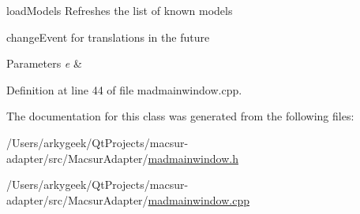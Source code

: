 load\-Models Refreshes the list of known models 

change\-Event for translations in the future 
\begin{DoxyParams}{Parameters}
{\em e} & \\
\hline
\end{DoxyParams}


Definition at line 44 of file madmainwindow.\-cpp.



The documentation for this class was generated from the following files\-:\begin{DoxyCompactItemize}
\item 
/\-Users/arkygeek/\-Qt\-Projects/macsur-\/adapter/src/\-Macsur\-Adapter/\hyperlink{madmainwindow_8h}{madmainwindow.\-h}\item 
/\-Users/arkygeek/\-Qt\-Projects/macsur-\/adapter/src/\-Macsur\-Adapter/\hyperlink{madmainwindow_8cpp}{madmainwindow.\-cpp}\end{DoxyCompactItemize}
